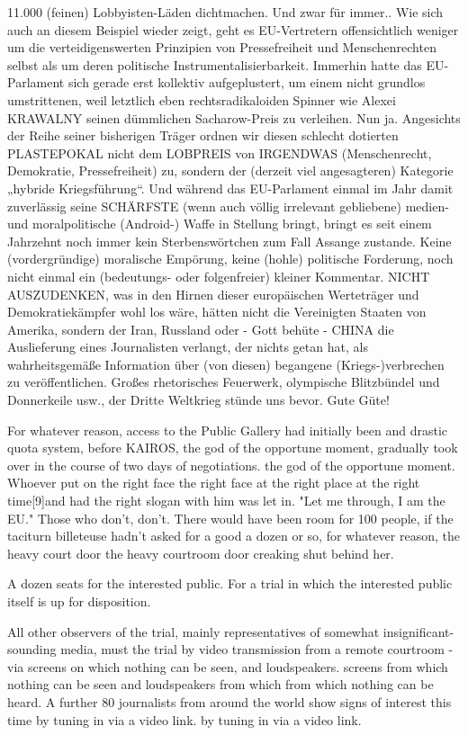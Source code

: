 \begin{multicols}{2}
{{11.000 (feinen) Lobbyisten-Läden dichtmachen. Und zwar für immer.}.
\textCR
Wie sich auch an diesem Beispiel wieder zeigt, geht es
EU-Vertretern offensichtlich weniger um die verteidigenswerten Prinzipien von Pressefreiheit und Menschenrechten selbst als um deren politische Instrumentalisierbarkeit.
\textCR
Immerhin hatte das EU-Parlament sich gerade erst kollektiv aufgeplustert, um einem nicht grundlos umstrittenen, weil letztlich eben rechtsradikaloiden Spinner wie
Alexei KRAWALNY seinen dümmlichen Sacharow-Preis
zu verleihen. Nun ja. Angesichts der Reihe seiner bisherigen Träger ordnen wir diesen schlecht dotierten PLASTEPOKAL nicht dem LOBPREIS von IRGENDWAS (Menschenrecht, Demokratie, Pressefreiheit) zu, sondern der
(derzeit viel angesagteren) Kategorie „hybride Kriegsführung“. Und während das EU-Parlament einmal im
Jahr damit zuverlässig seine SCHÄRFSTE (wenn auch völlig irrelevant gebliebene) medien- und moralpolitische (Android-) Waffe in Stellung bringt, bringt es seit
einem Jahrzehnt noch immer kein Sterbenswörtchen
zum Fall Assange zustande. Keine (vordergründige) moralische Empörung, keine (hohle) politische Forderung,
noch nicht einmal ein (bedeutungs- oder folgenfreier)
kleiner Kommentar.
NICHT AUSZUDENKEN, was in den Hirnen dieser europäischen Werteträger und Demokratiekämpfer wohl los
wäre, hätten nicht die Vereinigten Staaten von Amerika,
sondern der Iran, Russland oder - Gott behüte - CHINA
die Auslieferung eines Journalisten verlangt, der nichts
getan hat, als wahrheitsgemäße Information über (von
diesen) begangene (Kriegs-)verbrechen zu veröffentlichen. Großes rhetorisches Feuerwerk, olympische Blitzbündel und Donnerkeile usw., der Dritte Weltkrieg stünde uns bevor. Gute Güte!}


For whatever reason, access to the Public Gallery had initially been
and drastic quota system, before KAIROS, the god of the opportune moment, gradually took over in the course of two days of negotiations.
the god of the opportune moment. Whoever put on the right face
the right face at the right place at the right time[9]{and had the right slogan with him} was let in. "Let me through, I am the EU."
Those who don't, don't. There would have been room for
100 people, if the taciturn billeteuse hadn't asked for a good
a dozen or so, for whatever reason, the heavy court door
the heavy courtroom door creaking shut behind her.

A dozen seats for the interested public. For a trial in which the interested public itself is up for disposition.

All other observers of the trial, mainly representatives of somewhat insignificant-sounding media, must
the trial by video transmission from a remote courtroom - via screens on which nothing can be seen, and loudspeakers.
screens from which nothing can be seen and loudspeakers from which
from which nothing can be heard. A further 80 journalists from around the world
show signs of interest this time by tuning in via a video link.
by tuning in via a video link.


\end{multicols}
